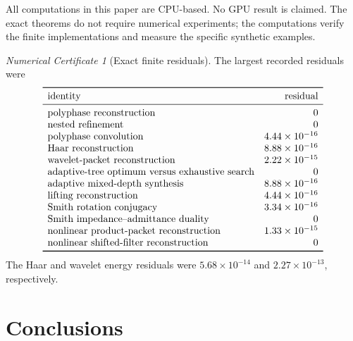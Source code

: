 \documentclass[11pt]{article}
\theoremstyle{definition}
\theoremstyle{remark}
\newtheorem{certificate}[theorem]{Numerical Certificate}
\begin{document}
All computations in this paper are CPU-based. No GPU result is claimed. The exact theorems do not require numerical experiments; the computations verify the finite implementations and measure the specific synthetic examples.

\begin{certificate}[Exact finite residuals]
The largest recorded residuals were
\[
\begin{array}{lr}
\toprule
\text{identity}&\text{residual}\\
\midrule
\text{polyphase reconstruction}&0\\
\text{nested refinement}&0\\
\text{polyphase convolution}&4.44\times10^{-16}\\
\text{Haar reconstruction}&8.88\times10^{-16}\\
\text{wavelet-packet reconstruction}&2.22\times10^{-15}\\
\text{adaptive-tree optimum versus exhaustive search}&0\\
\text{adaptive mixed-depth synthesis}&8.88\times10^{-16}\\
\text{lifting reconstruction}&4.44\times10^{-16}\\
\text{Smith rotation conjugacy}&3.34\times10^{-16}\\
\text{Smith impedance--admittance duality}&0\\
\text{nonlinear product-packet reconstruction}&1.33\times10^{-15}\\
\text{nonlinear shifted-filter reconstruction}&0\\
\bottomrule
\end{array}
\]
The Haar and wavelet energy residuals were $5.68\times10^{-14}$ and $2.27\times10^{-13}$, respectively.
\end{certificate}

\section{Conclusions}
\end{document}
